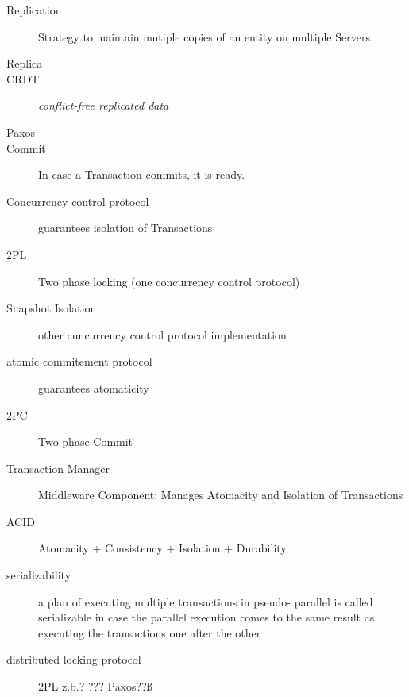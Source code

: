 \documentclass[a4paper,12pt]{article}%
\begin{document}
\begin{description}
	\item[Replication] Strategy to maintain mutiple copies of an entity on multiple Servers.
	\item[Replica] 
	\item[CRDT] {\it conflict-free replicated data}
	\item[Paxos] 
	\item[Commit] In case a Transaction commits, it is ready.
	\item[Concurrency control protocol] guarantees isolation of Transactions
	\item[2PL] Two phase locking (one concurrency control protocol)
	\item[Snapshot Isolation] other cuncurrency control protocol implementation
	\item[atomic commitement protocol] guarantees atomaticity
	\item[2PC] Two phase Commit
	\item[Transaction Manager] Middleware Component; Manages Atomacity and Isolation of Transactions
	\item[ACID]  Atomacity + Consistency + Isolation + Durability
	\item[serializability] a plan of executing multiple transactions in pseudo- parallel is called serializable in case the parallel execution comes to the same result as executing the transactions one after the other
	\item[distributed locking protocol] 2PL z.b.? ??? Paxos??ß
	
\end{description}
\end{document}
